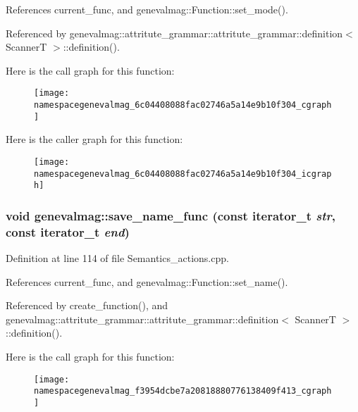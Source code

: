 References current\_\-func, and genevalmag::Function::set\_\-mode().

Referenced by genevalmag::attritute\_\-grammar::attritute\_\-grammar::definition$<$ ScannerT $>$::definition().

Here is the call graph for this function:\nopagebreak
\begin{figure}[H]
\begin{center}
\leavevmode
\texttt{[image: namespacegenevalmag\_6c04408088fac02746a5a14e9b10f304\_cgraph]}
\end{center}
\end{figure}


Here is the caller graph for this function:\nopagebreak
\begin{figure}[H]
\begin{center}
\leavevmode
\texttt{[image: namespacegenevalmag\_6c04408088fac02746a5a14e9b10f304\_icgraph]}
\end{center}
\end{figure}
\hypertarget{namespacegenevalmag_f3954dcbe7a20818880776138409f413}{
\subsubsection[{save\_\-name\_\-func}]{\setlength{\rightskip}{0pt plus 5cm}void genevalmag::save\_\-name\_\-func (const iterator\_\-t {\em str}, \/  const iterator\_\-t {\em end})}}
\label{namespacegenevalmag_f3954dcbe7a20818880776138409f413}




Definition at line 114 of file Semantics\_\-actions.cpp.

References current\_\-func, and genevalmag::Function::set\_\-name().

Referenced by create\_\-function(), and genevalmag::attritute\_\-grammar::attritute\_\-grammar::definition$<$ ScannerT $>$::definition().

Here is the call graph for this function:\nopagebreak
\begin{figure}[H]
\begin{center}
\leavevmode
\texttt{[image: namespacegenevalmag\_f3954dcbe7a20818880776138409f413\_cgraph]}
\end{center}
\end{figure}



